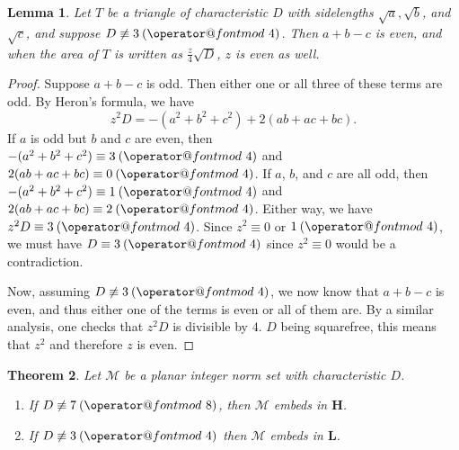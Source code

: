 \documentclass[10pt]{amsart}
\makeatletter
\newcommand{\M}{\mathcal{M}}
\renewcommand{\L}{\mathbf{L}}
\newcommand{\HH}{\mathbf{H}}
\newtheorem{thm}{Theorem}
\newtheorem{lem}[thm]{Lemma}
\DeclareRobustCommand{\pmod}{\@pmods}
\def\@pmods#1{\mkern4mu({\operator@font mod}\mkern 6mu#1)}
\makeatother
\begin{document}
\begin{lem} \label{lem:odd}
\normalfont
Let $T$ be a triangle of characteristic $D$ with sidelengths $\sqrt{a}, \sqrt{b}$, and $\sqrt{c}$, and suppose $D \not \equiv 3 \pmod{4}$.  Then $a+b-c$ is even, and when the area of $T$ is written as $\frac{z}{4}\sqrt{D}$, $z$ is even as well.
\end{lem}
\begin{proof}
Suppose $a+b-c$ is odd.  Then either one or all three of these terms are odd.  By Heron's formula, we have
$$
z^2D = -(a^2 + b^2 + c^2) + 2(ab+ac+bc).
$$
If $a$ is odd but $b$ and $c$ are even, then $-(a^2 + b^2 + c^2) \equiv 3 \pmod{4}$ and $2(ab+ac+bc) \equiv 0 \pmod{4}$.  If $a$, $b$, and $c$ are all odd, then $-(a^2 + b^2 + c^2) \equiv 1 \pmod{4}$ and $2(ab+ac+bc) \equiv 2 \pmod{4}$.  Either way, we have $z^2D \equiv 3 \pmod{4}$.  Since $z^2 \equiv 0$ or $1 \pmod{4}$, we must have $D \equiv 3 \pmod{4}$ since $z^2 \equiv 0$ would be a contradiction.

Now, assuming $D \not \equiv 3 \pmod{4}$, we now know that $a+b-c$ is even, and thus either one of the terms is even or all of them are.  By a similar analysis, one checks that $z^2D$ is divisible by $4$.  $D$ being squarefree, this means that $z^2$ and therefore $z$ is even.
\end{proof}

\begin{thm} \label{thm:planquatemb}
\normalfont
Let $\M$ be a planar integer norm set with characteristic $D$.
\begin{enumerate}
\item If $D \not \equiv 7 \pmod{8}$, then $\M$ embeds in $\HH$.
\item If $D \not \equiv 3 \pmod{4}$ then $\M$ embeds in $\L$.
\end{enumerate}
\end{thm}
\end{document}
